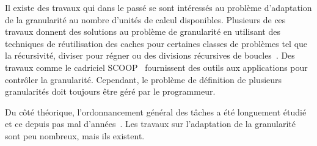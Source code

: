 Il existe des travaux qui dans le passé se sont intéressés au problème d'adaptation de la granularité au nombre d'unités de calcul disponibles.
%
Plusieurs de ces travaux donnent des solutions au problème de granularité en utilisant des techniques de réutilisation des caches pour certaines classes de problèmes tel que la récursivité, diviser pour régner ou des divisions récursives de boucles~\cite{unifieddataflow,Intel::TBB,Cilk,xkaapi,taskscomparison}.
%
Des travaux comme le cadriciel SCOOP~\cite{scoopp} fournissent des outils aux applications pour contrôler la granularité.
%
Cependant, le problème de définition de plusieurs granularités doit toujours être géré par le programmeur.


Du côté théorique, l'ordonnancement général des tâches a été longuement étudié et ce depuis pas mal d'années~\cite{Khan94acomparison,heft}.
%
Les travaux sur l'adaptation de la granularité sont peu nombreux, mais ils existent.
